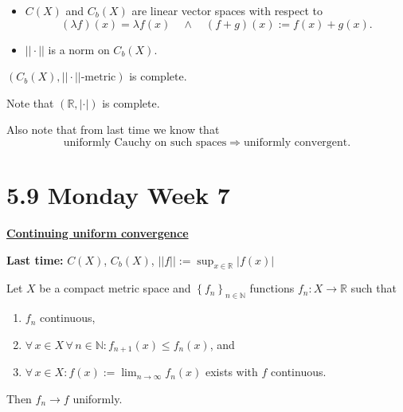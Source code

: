 \documentclass{notes}
\begin{document}
\begin{lem}
  \begin{itemize}
    \item $C(X)$ and $C_b(X)$ are linear vector spaces with respect to 
    \[
      (\lambda f)(x) = \lambda f(x) \quad \land \quad (f + g)(x) := f(x) + g(x).
    \]
    
    \item $|| \cdot ||$ is a norm on $C_b(X)$.
  \end{itemize}
\end{lem}

\begin{lem}
  $(C_b(X), || \cdot ||\text{-metric})$ is complete.
\end{lem}

\begin{prf}
  Note that $(\mathbb R, | \cdot |)$ is complete.
  
  Also note that from last time we know that 
  \[
    \text{uniformly Cauchy on such spaces} \Rightarrow \text{uniformly convergent}.
  \]
\end{prf}

\newpage

\section{5.9 Monday Week 7}

{\boldmath \bfseries \underline{Continuing uniform convergence}}

{\boldmath \bfseries Last time:} $C(X)$, $C_b(X)$, $||f|| := \sup_{x \in \mathbb R} \left | f(x) \right |$

\begin{thm}
  Let $X$ be a compact metric space and $\left \{ f_n \right \}_{n \in \mathbb N}$ functions $f_n \colon X \to \mathbb R$ such that 
  \begin{enumerate}
    \item $f_n$ continuous, 

    \item $\forall \, x \in X \, \forall \, n \in \mathbb N: f_{n + 1}(x) \leq f_n(x)$, and 

    \item $\forall \, x \in X: f(x) := \lim_{n \to \infty} f_n(x)$ exists with $f$ continuous.
  \end{enumerate}
  Then $f_n \to f$ uniformly.
\end{thm}
\end{document}
